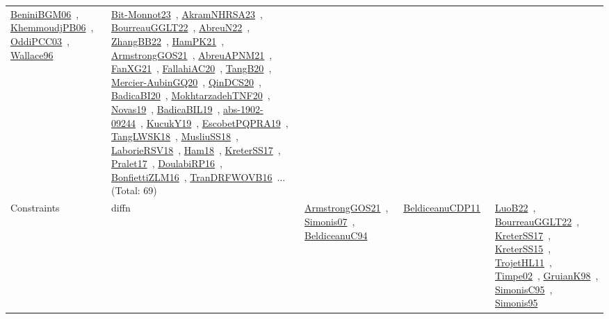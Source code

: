 {\begin{longtable}{lp{3cm}>{\raggedright\arraybackslash}p{6cm}>{\raggedright\arraybackslash}p{6cm}>{\raggedright\arraybackslash}p{8cm}}
\href{works/BeniniBGM06.pdf}{BeniniBGM06}~\cite{BeniniBGM06}, \href{works/KhemmoudjPB06.pdf}{KhemmoudjPB06}~\cite{KhemmoudjPB06}, \href{works/OddiPCC03.pdf}{OddiPCC03}~\cite{OddiPCC03}, \href{works/Wallace96.pdf}{Wallace96}~\cite{Wallace96} & \href{works/Bit-Monnot23.pdf}{Bit-Monnot23}~\cite{Bit-Monnot23}, \href{works/AkramNHRSA23.pdf}{AkramNHRSA23}~\cite{AkramNHRSA23}, \href{works/BourreauGGLT22.pdf}{BourreauGGLT22}~\cite{BourreauGGLT22}, \href{works/AbreuN22.pdf}{AbreuN22}~\cite{AbreuN22}, \href{works/ZhangBB22.pdf}{ZhangBB22}~\cite{ZhangBB22}, \href{works/HamPK21.pdf}{HamPK21}~\cite{HamPK21}, \href{works/ArmstrongGOS21.pdf}{ArmstrongGOS21}~\cite{ArmstrongGOS21}, \href{works/AbreuAPNM21.pdf}{AbreuAPNM21}~\cite{AbreuAPNM21}, \href{works/FanXG21.pdf}{FanXG21}~\cite{FanXG21}, \href{works/FallahiAC20.pdf}{FallahiAC20}~\cite{FallahiAC20}, \href{works/TangB20.pdf}{TangB20}~\cite{TangB20}, \href{works/Mercier-AubinGQ20.pdf}{Mercier-AubinGQ20}~\cite{Mercier-AubinGQ20}, \href{works/QinDCS20.pdf}{QinDCS20}~\cite{QinDCS20}, \href{works/BadicaBI20.pdf}{BadicaBI20}~\cite{BadicaBI20}, \href{works/MokhtarzadehTNF20.pdf}{MokhtarzadehTNF20}~\cite{MokhtarzadehTNF20}, \href{works/Novas19.pdf}{Novas19}~\cite{Novas19}, \href{works/BadicaBIL19.pdf}{BadicaBIL19}~\cite{BadicaBIL19}, \href{works/abs-1902-09244.pdf}{abs-1902-09244}~\cite{abs-1902-09244}, \href{works/KucukY19.pdf}{KucukY19}~\cite{KucukY19}, \href{works/EscobetPQPRA19.pdf}{EscobetPQPRA19}~\cite{EscobetPQPRA19}, \href{works/TangLWSK18.pdf}{TangLWSK18}~\cite{TangLWSK18}, \href{works/MusliuSS18.pdf}{MusliuSS18}~\cite{MusliuSS18}, \href{works/LaborieRSV18.pdf}{LaborieRSV18}~\cite{LaborieRSV18}, \href{works/Ham18.pdf}{Ham18}~\cite{Ham18}, \href{works/KreterSS17.pdf}{KreterSS17}~\cite{KreterSS17}, \href{works/Pralet17.pdf}{Pralet17}~\cite{Pralet17}, \href{works/DoulabiRP16.pdf}{DoulabiRP16}~\cite{DoulabiRP16}, \href{works/BonfiettiZLM16.pdf}{BonfiettiZLM16}~\cite{BonfiettiZLM16}, \href{works/TranDRFWOVB16.pdf}{TranDRFWOVB16}~\cite{TranDRFWOVB16}... (Total: 69)\\
Constraints & diffn & \href{works/ArmstrongGOS21.pdf}{ArmstrongGOS21}~\cite{ArmstrongGOS21}, \href{works/Simonis07.pdf}{Simonis07}~\cite{Simonis07}, \href{works/BeldiceanuC94.pdf}{BeldiceanuC94}~\cite{BeldiceanuC94} & \href{works/BeldiceanuCDP11.pdf}{BeldiceanuCDP11}~\cite{BeldiceanuCDP11} & \href{works/LuoB22.pdf}{LuoB22}~\cite{LuoB22}, \href{works/BourreauGGLT22.pdf}{BourreauGGLT22}~\cite{BourreauGGLT22}, \href{works/KreterSS17.pdf}{KreterSS17}~\cite{KreterSS17}, \href{works/KreterSS15.pdf}{KreterSS15}~\cite{KreterSS15}, \href{works/TrojetHL11.pdf}{TrojetHL11}~\cite{TrojetHL11}, \href{works/Timpe02.pdf}{Timpe02}~\cite{Timpe02}, \href{works/GruianK98.pdf}{GruianK98}~\cite{GruianK98}, \href{works/SimonisC95.pdf}{SimonisC95}~\cite{SimonisC95}, \href{works/Simonis95.pdf}{Simonis95}~\cite{Simonis95}\\

\end{longtable}}
